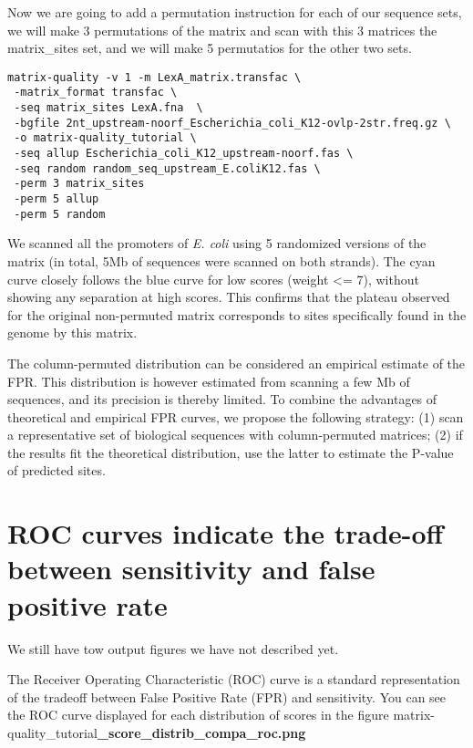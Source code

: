Now we are going to add a permutation instruction for each of our
sequence sets, we will make 3 permutations of the matrix and scan with
this 3 matrices the matrix\_sites set, and we will make 5 permutatios
for the other two sets.

{\color{Blue} \begin{footnotesize}
\begin{verbatim}
matrix-quality -v 1 -m LexA_matrix.transfac \
 -matrix_format transfac \
 -seq matrix_sites LexA.fna  \
 -bgfile 2nt_upstream-noorf_Escherichia_coli_K12-ovlp-2str.freq.gz \
 -o matrix-quality_tutorial \
 -seq allup Escherichia_coli_K12_upstream-noorf.fas \
 -seq random random_seq_upstream_E.coliK12.fas \
 -perm 3 matrix_sites
 -perm 5 allup
 -perm 5 random
\end{verbatim} \end{footnotesize} }

We scanned all the promoters of \textit{E. coli} using 5 randomized
versions of the matrix (in total, 5Mb of sequences were scanned on
both strands). The cyan curve closely follows the blue curve for low
scores (weight <= 7), without showing any separation at high
scores. This confirms that the plateau observed for the original
non-permuted matrix corresponds to sites specifically found in the
genome by this matrix.

The column-permuted distribution can be considered an empirical
estimate of the FPR. This distribution is however estimated from
scanning a few Mb of sequences, and its precision is thereby
limited. To combine the advantages of theoretical and empirical FPR
curves, we propose the following strategy: (1) scan a representative
set of biological sequences with column-permuted matrices; (2) if the
results fit the theoretical distribution, use the latter to estimate
the P-value of predicted sites.

\section{ROC curves indicate the trade-off between sensitivity and false positive rate}

We still have tow output figures we have not described yet.

The Receiver Operating Characteristic (ROC) curve is a standard
representation of the tradeoff between False Positive Rate (FPR) and
sensitivity.  You can see the ROC curve displayed for each
distribution of scores in the figure
matrix-quality\_tutorial\textbf{\_score\_distrib\_compa\_roc.png}

